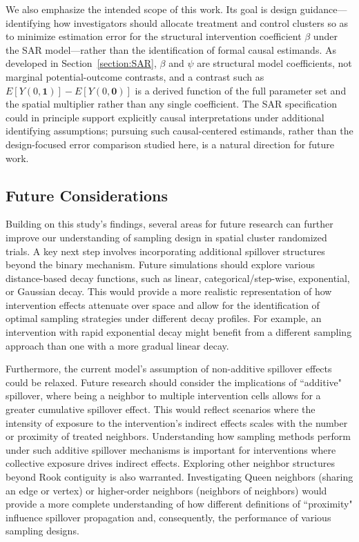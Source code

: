 \documentclass{article}[11pt]
\begin{document}
We also emphasize the intended scope of this work. Its goal is design guidance---identifying how investigators should allocate treatment and control clusters so as to minimize estimation error for the structural intervention coefficient $\beta$ under the SAR model---rather than the identification of formal causal estimands. As developed in Section~\ref{section:SAR}, $\beta$ and $\psi$ are structural model coefficients, not marginal potential-outcome contrasts, and a contrast such as $E[Y(0,\mathbf{1})] - E[Y(0,\mathbf{0})]$ is a derived function of the full parameter set and the spatial multiplier rather than any single coefficient. The SAR specification could in principle support explicitly causal interpretations under additional identifying assumptions; pursuing such causal-centered estimands, rather than the design-focused error comparison studied here, is a natural direction for future work.

\subsection{Future Considerations}

Building on this study's findings, several areas for future research can further improve our
understanding of sampling design in spatial cluster randomized trials. A key next step involves incorporating additional spillover structures beyond the binary mechanism. Future simulations should explore various distance-based decay functions, such
as linear, categorical/step-wise, exponential, or Gaussian decay. This would provide a more
realistic representation of how intervention effects attenuate over space and allow for the
identification of optimal sampling strategies under different decay profiles. For example, an
intervention with rapid exponential decay might benefit from a different sampling approach
than one with a more gradual linear decay.

Furthermore, the current model's assumption of non-additive spillover effects could be
relaxed. Future research should consider the implications of ``additive" spillover, where
being a neighbor to multiple intervention cells allows for a greater cumulative spillover effect.
This would reflect scenarios where the intensity of exposure to the intervention's indirect
effects scales with the number or proximity of treated neighbors. Understanding how
sampling methods perform under such additive spillover mechanisms is important for
interventions where collective exposure drives indirect effects. Exploring other neighbor structures beyond Rook contiguity is also warranted. Investigating Queen neighbors (sharing an edge or vertex) or higher-order neighbors (neighbors of
neighbors) would provide a more complete understanding of how different definitions of
``proximity" influence spillover propagation and, consequently, the performance of various
sampling designs.
\end{document}
